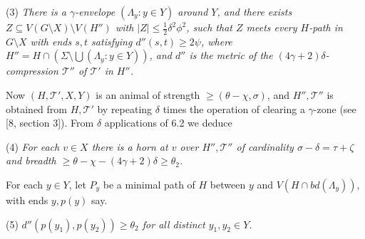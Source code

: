 \hspace*{12pt}(3) \textit{There is a $\gamma$-envelope $(\Lambda_y \colon y \in Y)$ around $Y$, and there exists $Z \subseteq V(G \setminus X) \setminus V(H'')$ with $|Z| \le \frac{1}{2}\delta^2 \phi^2$, such that $Z$ meets every $H$-path in $G \setminus X$ with ends $s, t$ satisfying $d''(s, t) \ge 2\psi$, where $H'' = H \cap (\Sigma \setminus \bigcup (\Lambda_y \colon y \in Y))$, and $d''$ is the metric of the $(4\gamma + 2)\delta$-compression $\mathscr{T}''$ of $\mathscr{T}'$ in $H''$.}

Now $(H, \mathscr{T}', X, Y)$ is an animal of strength $\ge (\theta - \chi, \sigma)$, and $H'', \mathscr{T}''$ is obtained from $H, \mathscr{T}'$ by repeating $\delta$ times the operation of clearing a $\gamma$-zone (see [8, section 3]). From $\delta$ applications of 6.2 we deduce

\hspace*{12pt}(4) \textit{For each $v \in X$ there is a horn at $v$ over $H'', \mathscr{T}''$ of cardinality $\sigma - \delta = \tau + \zeta$ and breadth $\ge \theta - \chi - (4\gamma + 2)\delta \ge \theta_2$.}

For each $y \in Y$, let $P_y$ be a minimal path of $H$ between $y$ and $V(H \cap bd(\Lambda_y))$, with ends $y, p(y)$ say.

\hspace*{12pt}(5) \textit{$d''(p(y_1), p(y_2)) \ge \theta_2$ for all distinct $y_1, y_2 \in Y$.}

